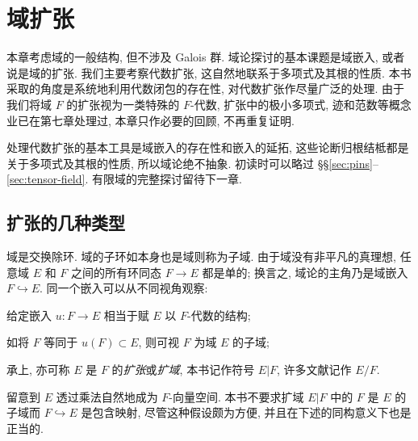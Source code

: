 
\chapter{域扩张}\label{sec:field-ext}
本章考虑域的一般结构, 但不涉及 Galois 群. 域论探讨的基本课题是域嵌入, 或者说是域的扩张. 我们主要考察代数扩张, 这自然地联系于多项式及其根的性质. 本书采取的角度是系统地利用代数闭包的存在性, 对代数扩张作尽量广泛的处理. 由于我们将域 $F$ 的扩张视为一类特殊的 $F$-代数, 扩张中的极小多项式, 迹和范数等概念业已在第七章处理过, 本章只作必要的回顾, 不再重复证明.

\begin{wenxintishi}
	处理代数扩张的基本工具是域嵌入的存在性和嵌入的延拓, 这些论断归根结柢都是关于多项式及其根的性质, 所以域论绝不抽象. 初读时可以略过 \S\S\ref{sec:pins}--\ref{sec:tensor-field}. 有限域的完整探讨留待下一章.
\end{wenxintishi}

\section{扩张的几种类型}
域是交换除环. 域的子环如本身也是域则称为子域. 由于域没有非平凡的真理想, 任意域 $E$ 和 $F$ 之间的所有环同态 $F \to E$ 都是单的; 换言之, 域论的主角乃是域嵌入 $F \hookrightarrow E$. 同一个嵌入可以从不同视角观察:
\begin{compactitem}
	\item 给定嵌入 $u: F \to E$ 相当于赋 $E$ 以 $F$-代数的结构;
	\item 如将 $F$ 等同于 $u(F) \subset E$, 则可视 $F$ 为域 $E$ 的子域;
	\item 承上, 亦可称 $E$ 是 $F$ 的\emph{扩张}或\emph{扩域}, 本书记作符号 $E|F$, 许多文献记作 $E/F$.
\end{compactitem}
留意到 $E$ 透过乘法自然地成为 $F$-向量空间. 本书不要求扩域 $E|F$ 中的 $F$ 是 $E$ 的子域而 $F \hookrightarrow E$ 是包含映射, 尽管这种假设颇为方便, 并且在下述的同构意义下也是正当的.
 
